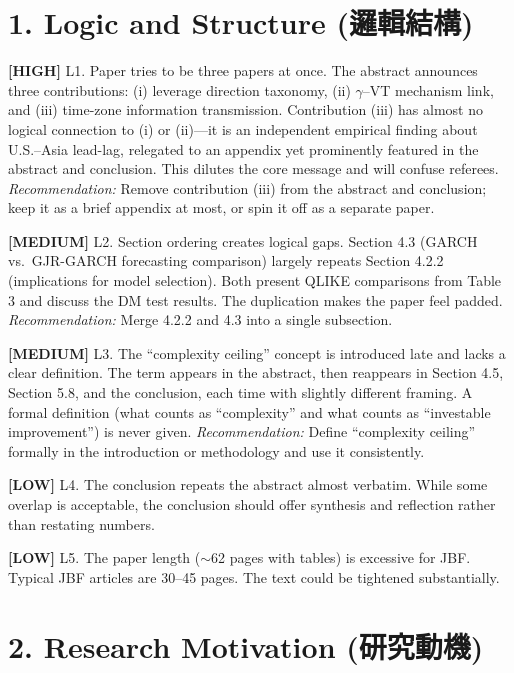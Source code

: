 \documentclass[12pt,a4paper]{article}
\newcommand{\high}[1]{\textcolor{errorred}{\textbf{[HIGH]} #1}}
\newcommand{\med}[1]{\textcolor{warncolor}{\textbf{[MEDIUM]} #1}}
\newcommand{\low}[1]{\textcolor{okgreen}{\textbf{[LOW]} #1}}
\begin{document}
\section*{1. Logic and Structure (邏輯結構)}

\high{L1. Paper tries to be three papers at once.} The abstract announces three contributions: (i) leverage direction taxonomy, (ii) $\gamma$--VT mechanism link, and (iii) time-zone information transmission. Contribution (iii) has almost no logical connection to (i) or (ii)---it is an independent empirical finding about U.S.--Asia lead-lag, relegated to an appendix yet prominently featured in the abstract and conclusion. This dilutes the core message and will confuse referees. \emph{Recommendation:} Remove contribution (iii) from the abstract and conclusion; keep it as a brief appendix at most, or spin it off as a separate paper.

\med{L2. Section ordering creates logical gaps.} Section 4.3 (GARCH vs.\ GJR-GARCH forecasting comparison) largely repeats Section 4.2.2 (implications for model selection). Both present QLIKE comparisons from Table 3 and discuss the DM test results. The duplication makes the paper feel padded. \emph{Recommendation:} Merge 4.2.2 and 4.3 into a single subsection.

\med{L3. The ``complexity ceiling'' concept is introduced late and lacks a clear definition.} The term appears in the abstract, then reappears in Section 4.5, Section 5.8, and the conclusion, each time with slightly different framing. A formal definition (what counts as ``complexity'' and what counts as ``investable improvement'') is never given. \emph{Recommendation:} Define ``complexity ceiling'' formally in the introduction or methodology and use it consistently.

\low{L4. The conclusion repeats the abstract almost verbatim.} While some overlap is acceptable, the conclusion should offer synthesis and reflection rather than restating numbers.

\low{L5. The paper length ($\sim$62 pages with tables) is excessive for JBF.} Typical JBF articles are 30--45 pages. The text could be tightened substantially.


\section*{2. Research Motivation (研究動機)}
\end{document}
